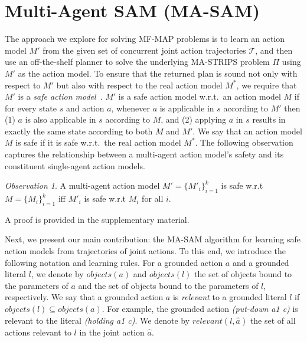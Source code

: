 \documentclass[letterpaper]{article} %
\theoremstyle{definition}
\theoremstyle{remark}
\newtheorem{observation}{Observation}
\newcommand{\objects}{\textit{objects}}
\newcommand{\relevant}{\textit{relevant}}
\newcommand{\realm}{\ensuremath{M^*}\xspace}
\newcommand{\masam}{\ac{MA-SAM}\xspace}
\newcommand{\mfmap}{\ac{MF-MAP}\xspace}
\begin{document}
\section{Multi-Agent SAM (MA-SAM)}
\label{sec:ma-sam}

The approach we explore for solving \mfmap problems is to learn 
an action model $M'$ from the given set of concurrent joint action trajectories $\mathcal{T}$, and then use an off-the-shelf planner to solve the underlying MA-STRIPS problem $\Pi$ using $M'$ as the action model. 
To ensure that the returned plan is sound not only with respect to $M'$ but also with respect to the real action model \realm, we require that $M'$ is a \emph{safe action model}~.
$M'$ is a safe action model w.r.t.\ an action model $M$ if for every state $s$ and action $a$, whenever $a$ is applicable in $s$ according to $M'$ then (1) $a$ is also applicable in $s$ according to $M$, and
(2) applying $a$ in $s$ results in exactly the same state according to both $M$ and $M'$. 
We say that an action model $M$ is safe if it is safe w.r.t.\ the real action model $\realm$.
The following observation captures the relationship between a multi-agent action model's safety and its constituent single-agent action models. 

\begin{observation}
A multi-agent action model $M'=\{M'_i\}_{i=1}^k$ is safe w.r.t $M=\{M_i\}_{i=1}^k$ iff $M'_i$ is safe w.r.t $M_i$ for all $i$.
\label{obs:safety-multi}
\end{observation}
\noindent A proof is provided in the supplementary material. 


Next, we present our main contribution: the \masam algorithm for learning safe action models from trajectories of joint actions. 
To this end, we introduce the following notation and learning rules.  
For a grounded action $a$ and a grounded literal $l$, we denote by $\objects(a)$ and $\objects(l)$ the 
set of objects bound to the parameters of $a$ and the set of objects bound to the parameters of $l$, respectively. 
We say that a grounded action $a$ is \emph{relevant} to a grounded literal $l$ if $\objects(l)\subseteq\objects(a)$. For example, the grounded action \textit{(put-down a1 c)} is relevant to the literal \textit{(holding a1 c)}.
We denote by $\relevant(l,\hat{a})$ the set of all actions relevant to $l$ in the joint action $\hat{a}$. 
\end{document}
